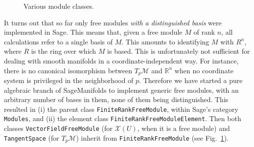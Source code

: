 \documentclass[a4paper]{jpconf}
\newcommand{\soft}[1]{\textsf{#1}}
\newcommand{\code}[1]{\texttt{#1}}
\newcommand{\Sage}{\soft{Sage}}
\newcommand{\SM}{\soft{SageManifolds}}
\begin{document}
\begin{figure}
\begin{center}
\end{center}
\caption{\label{f:module_classes} Various module classes.}
\end{figure}

It turns out that so far only free modules \emph{with a distinguished basis} were 
implemented in \Sage{}. This means that, given a free module $M$ of rank $n$, 
all calculations refer to a single basis of $M$. This amounts to identifying
$M$ with $R^n$, where $R$ is the ring over which $M$ is based. 
This is unfortunately not sufficient for dealing with smooth manifolds in a
coordinate-independent way. 
For instance, there is no canonical 
isomorphism between $T_p\mathcal{M}$ and $\mathbb{R}^n$ when no coordinate
system is privileged in the neighborhood of $p$.
Therefore we have started a pure algebraic branch of \SM{} to implement
generic free modules, with an arbitrary number of bases in them, 
none of them being distinguished. This resulted in (i) the parent class 
\code{FiniteRankFreeModule}, within \Sage{}'s category \code{Modules}, and (ii)
the element class 
\code{FiniteRankFreeModuleElement}. Then both classes
\code{VectorFieldFreeModule} (for $\mathscr{X}(U)$, when it is 
a free module) and \code{TangentSpace} (for $T_p\mathcal{M}$)
inherit from \code{FiniteRankFreeModule} (see Fig.~\ref{f:module_classes}). 
\end{document}
